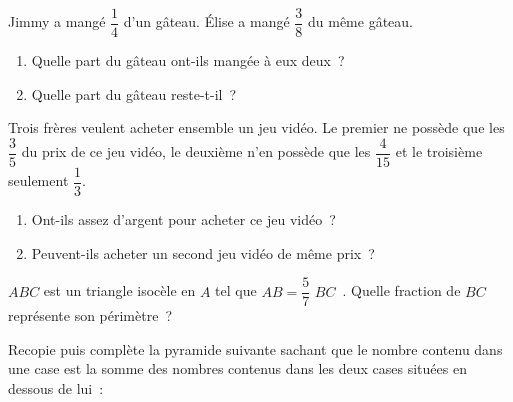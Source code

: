 \begin{exercice}
Jimmy a mangé $\dfrac{1}{4}$ d'un gâteau. Élise a mangé $\dfrac{3}{8}$ du même gâteau.
\begin{enumerate}
 \item Quelle part du gâteau ont-ils mangée à eux deux ?
 \item Quelle part du gâteau reste-t-il ?
 \end{enumerate}
\end{exercice}


\begin{exercice}
Trois frères veulent acheter ensemble un jeu vidéo. Le premier ne possède que les $\dfrac{3}{5}$ du prix de ce jeu vidéo, le deuxième n'en possède que les $\dfrac{4}{15}$ et le troisième seulement $\dfrac{1}{3}$. 
\begin{enumerate}
 \item Ont-ils assez d'argent pour acheter ce jeu vidéo ?
 \item Peuvent-ils acheter un second jeu vidéo de même prix ?
 \end{enumerate}
\end{exercice}


\begin{exercice}[Triangle]
$ABC$ est un triangle isocèle en $A$ tel que $AB = \dfrac{5}{7}\,\,BC$ . Quelle fraction de $BC$ représente son périmètre ?
\end{exercice}


\begin{exercice}[Pyramide]
Recopie puis complète la pyramide suivante sachant que le nombre contenu dans une case est la somme des nombres contenus dans les deux cases situées en dessous de lui :
\begin{center} $\boxed{\phantom{\dfrac{16}{42} \dfrac{16}{42} \dfrac{16}{42}}}$ \end{center}
\vspace{-0.72cm}
\begin{center}  \negthinspace {} \end{center}
\vspace{-0.8cm}
\begin{center}  \negthinspace {} \negthinspace  {} \end{center}
\vspace{-0.79cm}
\begin{center} \negthinspace {} \negthinspace {} \negthinspace {} \negthinspace {} \end{center}
\vspace{-0.69cm}
\end{exercice}

